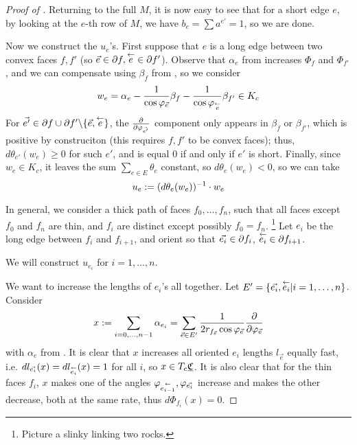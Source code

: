 \begin{proof}[Proof of ]
Returning to the full $M$, it is now easy to see that
for a short edge $e$,
by looking at the $e$-th row of $M$,
we have $b_e = \sum a^{e'} = 1$,
so we are done.



Now we construct the $u_e$'s.
First suppose that $e$ is a long edge between two convex faces $f, f'$
(so $\vec{e} \in \partial f, \overset{\leftarrow}{e} \in \partial f'$).
Observe that $\alpha_e$ from 
increases $\Phi_f$ and $\Phi_{f'}$,
and we can compensate using $\beta_f$ from ,
so we consider
\[
w_e = \alpha_e - \frac{1}{\cos \varphi_{\vec{e}}} \beta_f
	- \frac{1}{\cos \varphi_{\overset{\leftarrow}{e}}} \beta_{f'} \in K_c
\]
For $\vec{e'} \in \partial f \cup \partial f' \backslash \{\vec{e},\overset{\leftarrow}{e}\}$,
the ${\frac{\partial}{\partial \varphi_{\vec{e'}}}}$ component only appears in $\beta_f$
or $\beta_{f'}$, which is positive by construciton
(this requires $f,f'$ to be convex faces);
thus, $d\theta_{e'}(w_e) \geq 0$ for such $e'$, and
is equal 0 if and only if $e'$ is short.
Finally, since $w_e \in K_c$, it leaves the sum $\sum_{e\in E} \theta_e$
constant, so $d\theta_e(w_e) < 0$, so we can take
\begin{equation}
\label{e:u_e}
u_e := (d\theta_e(w_e))^{-1} \cdot w_e
\end{equation}

In general, we consider a thick path of faces $f_0, \ldots, f_n$,
such that all faces except $f_0$ and $f_n$ are thin,
and $f_i$ are distinct except possibly $f_0 = f_n$.
\footnote{Picture a slinky linking two rocks.}
Let $e_i$ be the long edge between $f_i$ and $f_{i+1}$,
and orient so that $\vec{e_i} \in \partial f_i$, $\overset{\leftarrow}{e_i} \in \partial f_{i+1}$.


We will construct $u_{e_i}$ for $i = 1,\ldots,n$.


We want to increase the lengths of $e_i$'s all together.
Let $E' = \{\vec{e_i}, \overset{\leftarrow}{e_i} | i=1,\ldots, n\}$.
Consider
\[
x :=
\sum_{i=0,\ldots,n-1} \alpha_{e_i}
=
\sum_{\vec{e} \in E'}
\frac{1}{2 r_{f_{\vec{e}}} \cos \varphi_{\vec{e}}} {\frac{\partial}{\partial \varphi_{\vec{e}}}}
\]
with $\alpha_e$ from .
It is clear that $x$ increases all oriented $e_i$ lengths
$l_{\vec{e}}$ equally fast,
i.e. $dl_{\vec{e_i}}(x) = dl_{\overset{\leftarrow}{e_i}}(x) = 1$ for all $i$,
so $x\in T_c {\underline{\mathfrak{C}}}$.
It is also clear that for the thin faces $f_i$,
$x$ makes one of the angles $\varphi_{\overset{\leftarrow}{e_{i-1}}}, \varphi_{\vec{e_i}}$
increase and makes the other decrease, both at the same rate,
thus $d\Phi_{f_i}(x) = 0$.


\end{proof}
